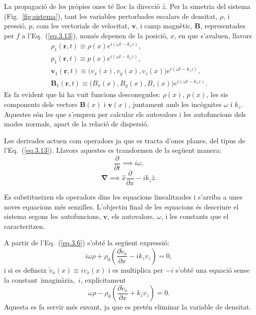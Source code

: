 La propagació de les pròpies ones té lloc la direcció $\hat{z}$.
Per la simetria del sistema (Fig.~\ref{fig:sistema}), tant les variables pertorbades escalars de densitat, $\rho$, i pressió, $p$, com les vectorials de velocitat, $\bm{v}$, i
camp magnètic, $\bm{B}$, representades per $f$ a l'Eq.~(\ref{eq.3.13}), només depenen de la posició, $x$, en que s'avaluen, llavors
\begin{gather}
	\rho_1(\bm{r}, t) \equiv \rho(x) e^{i(\omega t - k_z z)}, \tag{3.14} \label{3.14} \\
	p_1(\bm{r}, t) \equiv p(x) e^{i(\omega t - k_z z)}, \tag{3.15} \label{3.15} \\
	\bm{v}_1(\bm{r}, t) \equiv \big(v_{x}(x), v_{y}(x), v_{z}(x)\big) e^{i(\omega t - k_z z)}, \tag{3.16} \label{3.16} \\
	\bm{B}_1(\bm{r}, t) \equiv \big(B_{x}(x), B_{y}(x), B_{z}(x)\big) e^{i(\omega t - k_z z)}. \tag{3.17} \label{3.17}
\end{gather}
Es fa evident que hi ha vuit funcions desconegudes: $\rho(x)$, $p(x)$, les sis components dels vectors $\bm{B}(x)$ i $\bm{v}(x)$, juntament amb les incògnites $\omega$ i $k_z$.
Aquestes són les que s'empren per calcular els autovalors i les autofuncions dels modes normals, apart de la relació de dispersió.

Les derivades actuen com operadors ja que es tracta d'ones planes, del tipus de l'Eq.~(\ref{eq.3.13}).
Llavors aquestes es transformen de la següent manera:
\begin{equation}
	\frac{\partial}{\partial t} \implies i \omega, \tag{3.18} \label{eq.3.18}
\end{equation}
\begin{equation}
	\bm{\nabla} \implies \hat{x} \frac{\partial}{\partial x} - i k_z \hat{z}. \tag{3.19} \label{eq.3.19}
\end{equation}

Es substitueixen els operadors dins les equacions linealitzades i s'arriba a unes noves equacions més senzilles.
L'objectiu final de les equacions és descriure el sistema segons les autofuncions, $\bm{v}$, els autovalors, $\omega$, i les constants que el caracteritzen.

A partir de l'Eq.~(\ref{eq.3.6}) s'obté la següent expressió:
\begin{equation}
	i \omega \rho + \rho_0 \left( \frac{\partial \tilde{v}_{x}}{\partial x} - i k_z v_{z} \right) = 0, \tag{3.20} \label{eq.3.20}
\end{equation}
i si es defineix ${\tilde{v}_{x}}(x) \equiv i {v}_{x}(x)$ i es multiplica per $-i$ s'obté una equació sense la constant~imaginària,~$i$, explícitament
\begin{equation}
	\omega \rho - \rho_0 \left( \frac{\partial \tilde{v}_{x}}{\partial x} + k_z v_{z} \right) = 0. \tag{3.21} \label{eq.3.21}
\end{equation}
Aquesta es fa servir més envant, ja que es pretén eliminar la variable de densitat.

